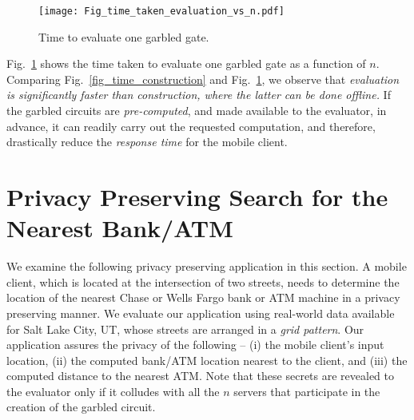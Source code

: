 \documentclass[10pt,journal,cspaper,compsoc]{IEEEtran}
\begin{document}
\begin{figure}[t]
\centering
\texttt{[image: Fig\_time\_taken\_evaluation\_vs\_n.pdf]}
\vspace{-3 mm}
\caption{Time to evaluate one garbled gate.\vspace{-3 mm}}
\label{fig_time_evaluation}
\end{figure}

Fig.~\ref{fig_time_evaluation} shows the time taken to evaluate one garbled gate as a function of $n$. Comparing Fig.~\ref{fig_time_construction} and Fig.~\ref{fig_time_evaluation}, we observe that {\em evaluation is significantly faster than construction, where the latter can be done offline.} If the garbled circuits are {\em pre-computed}, and made available to the evaluator, in advance, it can readily carry out the requested computation, and therefore, drastically reduce the {\em response time} for the mobile client.





 \section{Privacy Preserving Search for the Nearest Bank/ATM}
\label{sec_manhattan_distance}


We examine the following privacy preserving application in this section. A mobile client, which is located at the intersection of two streets, needs to determine the location of the nearest Chase or Wells Fargo bank or ATM machine in a privacy preserving manner. We evaluate our application using real-world data available for Salt Lake City, UT, whose streets are arranged in a {\em grid pattern}. Our application assures the privacy of the following -- (i) the mobile client's input location, (ii) the computed bank/ATM location nearest to the client, and (iii) the computed distance to the nearest ATM. Note that these secrets are revealed to the evaluator only if it colludes with all the $n$ servers that participate in the creation of the garbled circuit.
\end{document}
